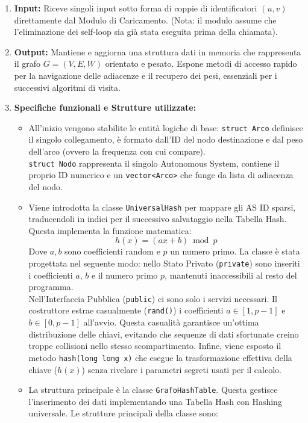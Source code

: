 \documentclass[12pt, a4paper]{article}
\begin{document}
\begin{enumerate}
    \item \textbf{Input:} Riceve singoli input sotto forma di coppie di identificatori $(u, v)$ direttamente dal Modulo di Caricamento. (Nota: il modulo assume che l'eliminazione dei self-loop sia già stata eseguita prima della chiamata).
    \item \textbf{Output:} Mantiene e aggiorna una struttura dati in memoria che rappresenta il grafo $G=(V,E,W)$ orientato e pesato. Espone metodi di accesso rapido per la navigazione delle adiacenze e il recupero dei pesi, essenziali per i successivi algoritmi di visita.  
    \item \textbf{Specifiche funzionali e Strutture utilizzate:}
    \begin{itemize}
        \item[-] All'inizio vengono stabilite le entità logiche di base: \texttt{struct Arco} definisce il singolo collegamento, è formato dall'ID del nodo destinazione e dal peso dell'arco (ovvero la frequenza con cui compare). \\
        \texttt{struct Nodo} rappresenta il singolo Autonomous System, contiene il proprio ID numerico e un \texttt{vector<Arco>} che funge da lista di adiacenza del nodo.
        \item[-] Viene introdotta la classe \texttt{UniversalHash} per mappare gli AS ID sparsi, traducendoli in indici per il successivo salvataggio nella Tabella Hash. Questa implementa la funzione matematica:
        \begin{equation}
            h(x) = (ax + b) \bmod p
        \end{equation}
        Dove $a,b$ sono coefficienti random e $p$ un numero primo. La classe è stata progettata nel seguente modo: nello Stato Privato (\texttt{private}) sono inseriti i coefficienti $a$, $b$ e il numero primo $p$, mantenuti inaccessibili al resto del programma. \\
        Nell'Interfaccia Pubblica (\texttt{public}) ci sono solo i servizi necessari. Il costruttore estrae casualmente (\texttt{rand()}) i coefficienti $a \in [1, p-1]$ e $b \in [0, p-1]$ all'avvio. Questa casualità garantisce un'ottima distribuzione delle chiavi, evitando che sequenze di dati sfortunate creino troppe collisioni nello stesso scompartimento. Infine, viene esposto il metodo \texttt{hash(long long x)} che esegue la trasformazione effettiva della chiave ($h(x)$) senza rivelare i parametri segreti usati per il calcolo.
        \item[-] La struttura principale è la classe \texttt{GrafoHashTable}. Questa gestisce l'inserimento dei dati implementando una Tabella Hash con Hashing universale. Le strutture principali della classe sono: \\

\end{itemize}
\end{enumerate}
\end{document}
